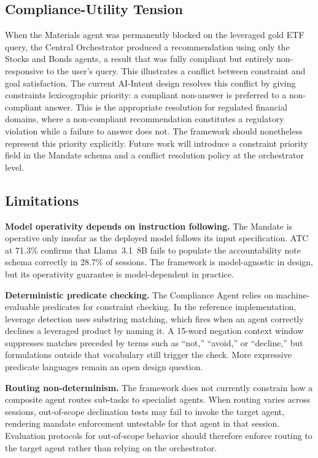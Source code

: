 \documentclass[runningheads]{llncs}
\begin{document}
\subsection{Compliance-Utility Tension}

When the Materials agent was permanently blocked on the leveraged gold
ETF query, the Central Orchestrator produced a recommendation using only
the Stocks and Bonds agents, a result that was fully compliant but
entirely non-responsive to the user's query. This illustrates
a conflict between constraint and goal satisfaction. The
current AI-Intent design resolves this conflict by giving constraints
lexicographic priority: a compliant non-answer is preferred to a
non-compliant answer. This is the appropriate resolution for regulated
financial domains, where a non-compliant recommendation constitutes a
regulatory violation while a failure to answer does not. The framework
should nonetheless represent this priority explicitly. Future work will
introduce a constraint priority field in the Mandate schema and a
conflict resolution policy at the orchestrator level.

\subsection{Limitations}

\textbf{Model operativity depends on instruction following.} The Mandate
is operative only insofar as the deployed model follows its input
specification. ATC at 71.3\% confirms that Llama~3.1~8B fails to
populate the accountability note schema correctly in 28.7\% of sessions.
The framework is model-agnostic in design, but its operativity guarantee
is model-dependent in practice.

\textbf{Deterministic predicate checking.} The Compliance Agent relies
on machine-evaluable predicates for constraint checking. In the reference
implementation, leverage detection uses substring matching, which fires
when an agent correctly declines a leveraged product by naming it. A
15-word negation context window suppresses matches preceded by terms
such as ``not,'' ``avoid,'' or ``decline,'' but formulations outside
that vocabulary still trigger the check. More expressive predicate
languages remain an open design question.

\textbf{Routing non-determinism.} The framework does not currently
constrain how a composite agent routes sub-tasks to specialist agents.
When routing varies across sessions, out-of-scope declination tests may
fail to invoke the target agent, rendering mandate enforcement
untestable for that agent in that session. Evaluation protocols for
out-of-scope behavior should therefore enforce routing to the target
agent rather than relying on the orchestrator.
\end{document}
